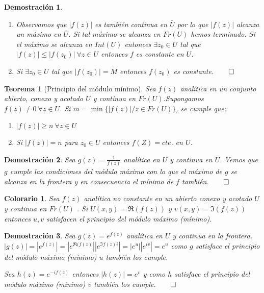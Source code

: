 \documentclass[12pt]{book}
\newtheorem{theorem}{Teorema}[chapter]
\newtheorem*{dem}{Demostración}
\newtheorem{col}{Colorario}[chapter]
\begin{document}
\begin{dem}\ \\
\begin{enumerate}
\item Observamos que $|f(z)|$ es también continua en $\bar{U}$ por lo que $|f(z)|$ alcanza un máximo en $\bar{U}$. Si tal máximo se alcanza en $Fr(U)$ hemos terminado.
Si el máximo se alcanza en  $Int(U)$ entonces $\exists z_0 \in U$ tal que $|f(z)|\leq |f(z_0)| \ \forall z\in U$ entonces $f$ es constante en $U$.
\item Si $\exists z_0 \in U$ tal que $|f(z_0)| = M$ entonces $f(z_0)$ es constante.$\qed$
\end{enumerate}
\end{dem}


\begin{theorem}[Principio del módulo mínimo]
Sea $f(z)$ analítica en un conjunto abierto, conexo y acotado $U$ y continua en $Fr(U)$.Supongamos $f(z)\neq 0\ \forall z\in U$. Si $m =\min \{|f(z)|/ z\in Fr(U)\}$, se cumple que:
\begin{enumerate}
\item $|f(z)|\geq n \ \forall z \in U$
\item Si $|f(z)| = n$ para $z_0 \in U$ entonces $f(Z) = cte.$ en $U$.
\end{enumerate}
\end{theorem}

\begin{dem}
Sea $g(z)= \frac{1}{f(z)}$ analítica en $U$ y continua en $\bar U$. Vemos que $g$ cumple las condiciones del módulo máximo con lo que el máximo de $g$ se alcanza en la frontera y en consecuencia el mínimo de $f$ también.$\qed$
\end{dem}

\begin{col}
Sea $f(z)$ analítica no constante en un abierto conexo y acotado $U$ y continua en $Fr(U)$ . Si $U(x,y) = \Re(f(z))$ y $v(x,y) = \Im(f(z))$ entonces $u,v$ satisfacen el principio del módulo máximo (mínimo).
\end{col}

\begin{dem}
Sea $g(z)= e^{f(z)}$ analítica en $U$ y continua en la frontera. $|g(z)| = |e^{f(z)}| = |e^{\Re(f(z)}||e^{\Im{f(z)}i}| = |e^u||e^{iv}| = e^u$ como $g$ satisface el principio del módulo máximo (mínimo) $u$ también los cumple.

Sea  $ h(z) = e^{-if(z)}$ entonces $|h(z)| = e^v$ y como $h$ satisface el principio del módulo máximo (mínimo) $v$ también los cumple.$\qed$
\end{dem}
\end{document}
